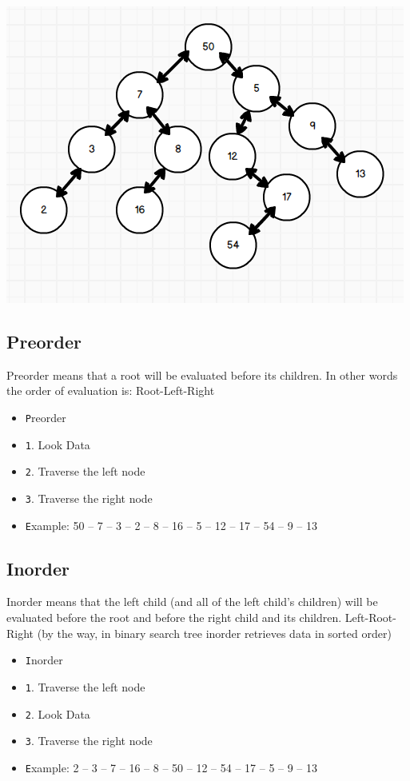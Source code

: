 \documentclass[12pt]{article}
\begin{document}
        \begin{centering}
  
      \includegraphics[width=\linewidth/3*2]{binary-tree.png}

    \end{centering}
    \newpage
    \subsection{Preorder}
    Preorder means that a root will be evaluated before its children. In other words the order of evaluation is: Root-Left-Right
    \begin{itemize}
     \item \texttt Preorder
     \item \texttt 1. Look Data
     \item \texttt 2. Traverse the left node
     \item \texttt 3. Traverse the right node 
     \item \texttt Example:  50 – 7 – 3 – 2 – 8 – 16 – 5 – 12 – 17 – 54 – 9 – 13
    \end{itemize}
    \subsection{Inorder}
    Inorder means that the left child (and all of the left child’s children) will be evaluated before the root and before the right child and its children. Left-Root-Right (by the way, in binary search tree inorder retrieves data in sorted order)
    \begin{itemize}
     \item \texttt Inorder
     \item \texttt 1. Traverse the left node
     \item \texttt 2. Look Data
     \item \texttt 3. Traverse the right node 
     \item \texttt Example:  2 – 3 – 7 – 16 – 8 – 50 – 12 – 54 – 17 – 5 – 9 – 13
    \end{itemize}
\end{document}
